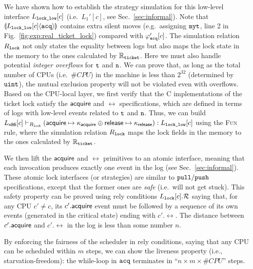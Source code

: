 We have shown how to establish the strategy simulation
for this low-level interface $L_\codeinmath{lock\_low}[c]$ (i.e.\, $L_1'[c]$, see Sec.~\ref{sec:informal}).
Note that $\ssem{\codeinmath{acq}}{L_\codeinmath{lock\_low}[c]}$ contains extra silent moves (e.g.\, assigning $\codeinmath{myt}$, line 2 in Fig.~\ref{fig:exp:real_ticket_lock}) compared with $\strat{\codeinmath{acq}}'[c]$.
The simulation relation 
$R_\codeinmath{lock}$ not only states the equality between logs but also maps the lock
state in the memory to the ones calculated by $\replay_{\codeinmath{ticket}}$.
Here we must also handle potential \emph{integer overflows} for $\codeinmath{t}$ and $\codeinmath{n}$.
We can prove that, as long as the total number of CPUs (i.e.\, $\#CPU$) in the machine is less than $2^{32}$ (determined by $\codeinmath{uint}$), the mutual exclusion property will not be violated  even with overflows. 
Based on the CPU-local layer, we first verify that the C implementations of 
the ticket lock satisfy the $\acq$ and $\rel$ specifications,
which are defined in terms of logs with low-level events
related to $\codeinmath{t}$ and $\codeinmath{n}$.
Thus, we can build $\ltyp{\PLayer{\PBoot}{c}{}}{R_\codeinmath{lock}}{(\modulef{\acq}
\oplus \modulef{\rel})}{\PLayer{L_\codeinmath{lock\_low}}{c}{}}$
using the \textsc{Fun} rule,
where the simulation relation $R_\codeinmath{lock}$ maps the lock
fields in the memory to the ones calculated by $\replay_{\codeinmath{ticket}}$.

We then lift the $\acq$ and $\rel$ primitives to an atomic interface, meaning that each
invocation produces exactly one event in the log (see Sec.~\ref{sec:informal}).
These atomic lock interfaces (or strategies) are similar to $\cpull/\cpush$ specifications,
except that the former ones are \emph{safe} (i.e.\, will not get stuck).
This safety property can be proved using rely conditions $L_\codeinmath{lock}[c].\Rely$ saying that,
for any CPU $c'\neq c$, its $c'.\acq$ event must be followed by a sequence of its own events (generated in the critical state)
ending with $c'.\rel$. The distance between $c'.\acq$ and $c'.\rel$ in the log is less than some number $n$.

By enforcing the fairness of the scheduler in rely conditions, saying that any CPU can be scheduled
within $m$ steps, we can show the liveness property (i.e., starvation-freedom): the while-loop in $\codeinmath{acq}$ terminates
in ``$n \times m \times \#CPU$'' steps.
